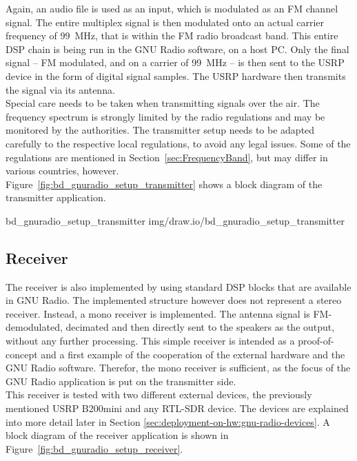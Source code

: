 Again, an audio file is used as an input, which is modulated as an FM channel signal.
The entire multiplex signal is then modulated onto an actual carrier frequency of 99~MHz, that is within the FM radio broadcast band.
This entire DSP chain is being run in the GNU Radio software, on a host PC.
Only the final signal -- FM modulated, and on a carrier of 99~MHz -- is then sent to the USRP device in the form of digital signal samples.
The USRP hardware then transmits the signal via its antenna.\\

Special care needs to be taken when transmitting signals over the air.
The frequency spectrum is strongly limited by the radio regulations and may be monitored by the authorities.
The transmitter setup needs to be adapted carefully to the respective local regulations, to avoid any legal issues.
Some of the regulations are mentioned in Section~\ref{sec:FrequencyBand}, but may differ in various countries, however.\\

\noindent
Figure~\ref{fig:bd_gnuradio_setup_transmitter} shows a block diagram of the transmitter application.

 {bd_gnuradio_setup_transmitter} {img/draw.io/bd_gnuradio_setup_transmitter}

\subsection{Receiver}

The receiver is also implemented by using standard DSP blocks that are available in GNU Radio.
The implemented structure however does not represent a stereo receiver.
Instead, a mono receiver is implemented.
The antenna signal is FM-demodulated, decimated and then directly sent to the speakers as the output, without any further processing.
This simple receiver is intended as a proof-of-concept and a first example of the cooperation of the external hardware and the GNU Radio software.
Therefor, the mono receiver is sufficient, as the focus of the GNU Radio application is put on the transmitter side.\\

This receiver is tested with two different external devices, the previously mentioned USRP B200mini and any RTL-SDR device.
The devices are explained into more detail later in Section \ref{sec:deployment-on-hw:gnu-radio-devices}.
A block diagram of the receiver application is shown in Figure~\ref{fig:bd_gnuradio_setup_receiver}.

